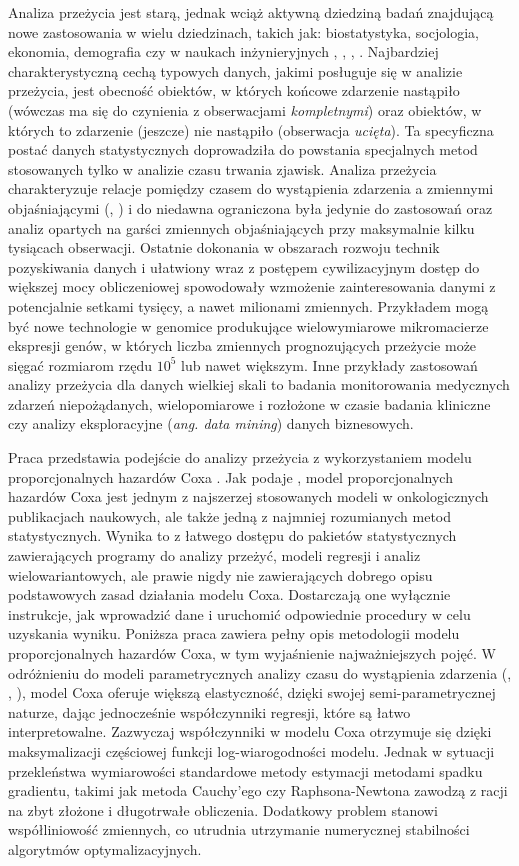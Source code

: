 Analiza przeżycia jest starą, jednak wciąż aktywną dziedziną badań znajdującą nowe zastosowania w wielu dziedzinach, takich jak: biostatystyka, socjologia, ekonomia, demografia czy w naukach inżynieryjnych \cite{heckman}, \cite{collett}, \cite{boxst}, \cite{hosmer}. Najbardziej charakterystyczną cechą typowych danych, jakimi posługuje się w analizie przeżycia, jest obecność obiektów, w których końcowe zdarzenie nastąpiło (wówczas ma się do czynienia z obserwacjami \textit{kompletnymi}) oraz obiektów, w których to zdarzenie (jeszcze) nie nastąpiło (obserwacja \textit{ucięta}). Ta specyficzna postać danych statystycznych doprowadziła do powstania specjalnych metod stosowanych tylko w analizie czasu trwania zjawisk. Analiza przeżycia charakteryzuje relacje pomiędzy czasem do wystąpienia zdarzenia a zmiennymi objaśniającymi (\cite{kalf}, \cite{oakes}) i do niedawna ograniczona była jedynie do zastosowań oraz analiz opartych na garści zmiennych objaśniających przy maksymalnie kilku tysiącach obserwacji. Ostatnie dokonania w obszarach rozwoju technik pozyskiwania danych i ułatwiony wraz z postępem cywilizacyjnym dostęp do większej mocy obliczeniowej spowodowały wzmożenie zainteresowania danymi z potencjalnie setkami tysięcy, a nawet milionami zmiennych. Przykładem mogą być nowe technologie w genomice produkujące wielowymiarowe mikromacierze ekspresji genów, w których liczba zmiennych prognozujących przeżycie może sięgać rozmiarom rzędu $10^5$ lub nawet większym. Inne przykłady zastosowań analizy przeżycia dla danych wielkiej skali to badania monitorowania medycznych zdarzeń niepożądanych, wielopomiarowe i rozłożone w czasie badania kliniczne czy analizy eksploracyjne (\textit{ang. data mining}) danych biznesowych.

Praca przedstawia podejście do analizy przeżycia z wykorzystaniem modelu proporcjonalnych hazardów Coxa \cite{cox}. Jak podaje \cite{assel}, model proporcjonalnych hazardów Coxa jest jednym z najszerzej stosowanych modeli w onkologicznych publikacjach naukowych, ale także jedną z najmniej rozumianych metod statystycznych. Wynika to z łatwego dostępu do pakietów statystycznych zawierających programy do analizy przeżyć, modeli regresji i analiz wielowariantowych, ale prawie nigdy nie zawierających dobrego opisu podstawowych zasad działania modelu Coxa. Dostarczają one wyłącznie instrukcje, jak wprowadzić dane i uruchomić odpowiednie procedury w celu uzyskania wyniku. Poniższa praca zawiera pełny opis metodologii modelu proporcjonalnych hazardów Coxa, w tym wyjaśnienie najważniejszych pojęć. W odróżnieniu do modeli parametrycznych analizy czasu do wystąpienia zdarzenia (\cite{klein}, \cite{collett}, \cite{hosmer}), model Coxa oferuje większą elastyczność, dzięki swojej semi-parametrycznej naturze, dając jednocześnie  współczynniki regresji, które są łatwo interpretowalne. Zazwyczaj współczynniki w modelu Coxa otrzymuje się dzięki maksymalizacji częściowej funkcji log-wiarogodności modelu. Jednak w sytuacji przekleństwa wymiarowości standardowe metody estymacji metodami spadku gradientu, takimi jak metoda Cauchy'ego czy Raphsona-Newtona zawodzą z racji na zbyt złożone i długotrwałe obliczenia. Dodatkowy problem stanowi współliniowość zmiennych, co utrudnia utrzymanie numerycznej stabilności algorytmów optymalizacyjnych. 

